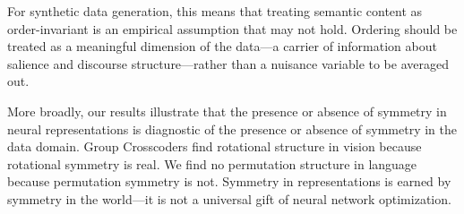 \documentclass[10pt, letterpaper]{article}
\begin{document}
For synthetic data generation, this means that treating semantic content as order-invariant is an empirical assumption that may not hold. Ordering should be treated as a meaningful dimension of the data---a carrier of information about salience and discourse structure---rather than a nuisance variable to be averaged out.

More broadly, our results illustrate that the presence or absence of symmetry in neural representations is diagnostic of the presence or absence of symmetry in the data domain. Group Crosscoders find rotational structure in vision because rotational symmetry is real. We find no permutation structure in language because permutation symmetry is not. Symmetry in representations is earned by symmetry in the world---it is not a universal gift of neural network optimization.
\end{document}
